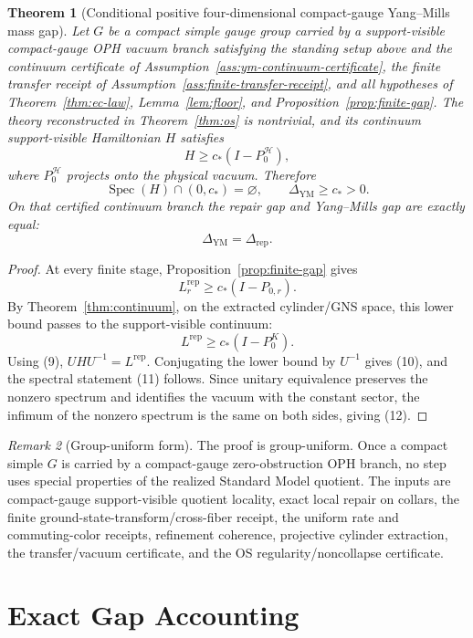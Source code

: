 \documentclass[11pt]{article}
\numberwithin{equation}{section}
\newtheorem{theorem}{Theorem}[section]
\theoremstyle{remark}
\newtheorem{remark}[theorem]{Remark}
\newcommand{\YM}{\mathrm{YM}}
\newcommand{\Rep}{\mathrm{rep}}
\newcommand{\Hcal}{\mathcal H}
\begin{document}
\begin{theorem}[Conditional positive four-dimensional compact-gauge Yang--Mills mass gap]
\label{thm:main}
Let \(G\) be a compact simple gauge group carried by a support-visible compact-gauge OPH vacuum
branch satisfying the standing setup above and the continuum certificate of
Assumption~\ref{ass:ym-continuum-certificate}, the finite transfer receipt of
Assumption~\ref{ass:finite-transfer-receipt}, and all hypotheses of
Theorem~\ref{thm:ec-law}, Lemma~\ref{lem:floor}, and
Proposition~\ref{prop:finite-gap}. The theory reconstructed in
Theorem~\ref{thm:os}
is nontrivial, and its continuum support-visible Hamiltonian \(H\) satisfies
\[
H\ge c_*(I-P_0^{\Hcal}),
\tag{10}
\]
where \(P_0^{\Hcal}\) projects onto the physical vacuum. Therefore
\[
\operatorname{Spec}(H)\cap(0,c_*)=\varnothing,
\qquad
\Delta_{\YM}\ge c_*>0.
\tag{11}
\]
On that certified continuum branch the repair gap and Yang--Mills gap are exactly equal:
\[
\Delta_{\YM}=\Delta_{\mathrm{rep}}.
\tag{12}
\]
\end{theorem}

\begin{proof}
At every finite stage, Proposition~\ref{prop:finite-gap} gives
\[
L_r^{\Rep}\ge c_*(I-P_{0,r}).
\]
By Theorem~\ref{thm:continuum}, on the extracted cylinder/GNS space, this lower bound passes to
the support-visible continuum:
\[
L^{\mathrm{rep}}\ge c_*(I-P_0^K).
\]
Using (9), \(UHU^{-1}=L^{\mathrm{rep}}\). Conjugating the lower bound by \(U^{-1}\) gives (10),
and the spectral statement (11) follows. Since unitary equivalence preserves the nonzero spectrum
and identifies the vacuum with the constant sector, the infimum of the nonzero spectrum is the
same on both sides, giving (12).
\end{proof}

\begin{remark}[Group-uniform form]
The proof is group-uniform. Once a compact simple \(G\) is carried by a compact-gauge
zero-obstruction OPH branch, no step uses special properties of the realized Standard Model
quotient. The inputs are compact-gauge support-visible quotient locality, exact local repair on
collars, the finite ground-state-transform/cross-fiber receipt, the uniform rate and commuting-color
receipts, refinement coherence, projective cylinder extraction, the transfer/vacuum certificate,
and the OS regularity/noncollapse certificate.
\end{remark}

\section{Exact Gap Accounting}
\end{document}
